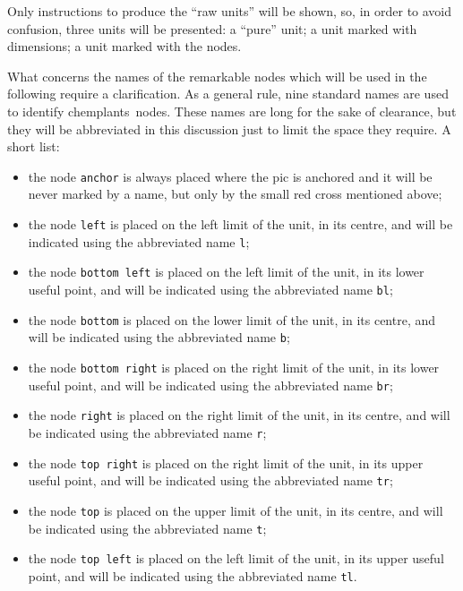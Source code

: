 \documentclass[12pt]{article}						%
\newcommand*{\chpn}[1]{\texttt{#1}}				%
\newcommand*{\chemplants}{chemplants}
\begin{document}
Only instructions to produce the ``raw units'' will be shown, so, in order to
avoid confusion, three units will be presented: a ``pure'' unit; a unit marked
with dimensions; a unit marked with the nodes.

What concerns the names of the remarkable nodes which will be used in the
following require a clarification. As a general rule, nine standard names are
used to identify \chemplants\ nodes. These names are long for the sake of
clearance, but they will be abbreviated in this discussion just to limit the
space they require. A short list:
\begin{itemize}
	\item the node \chpn{anchor} is always placed where the pic is anchored and
		it will be never marked by a name, but only by the small red cross
		mentioned above;
	\item the node \chpn{left} is placed on the left limit of the unit, in its
		centre, and will be indicated using the abbreviated name \chpn{l};
	\item the node \chpn{bottom left} is placed on the left limit of the unit,
		in its lower useful point, and will be indicated using the abbreviated
		name \chpn{bl};
	\item the node \chpn{bottom} is placed on the lower limit of the unit, in
		its centre, and will be indicated using the abbreviated name \chpn{b};
	\item the node \chpn{bottom right} is placed on the right limit of the unit,
		in its lower useful point, and will be indicated using the abbreviated
		name \chpn{br};
	\item the node \chpn{right} is placed on the right limit of the unit, in its
		centre, and will be indicated using the abbreviated name \chpn{r};
	\item the node \chpn{top right} is placed on the right limit of the unit,
		in its upper useful point, and will be indicated using the abbreviated
		name \chpn{tr};
	\item the node \chpn{top} is placed on the upper limit of the unit, in
		its centre, and will be indicated using the abbreviated name \chpn{t};
	\item the node \chpn{top left} is placed on the left limit of the unit,
		in its upper useful point, and will be indicated using the abbreviated
		name \chpn{tl}.
\end{itemize}
\end{document}
